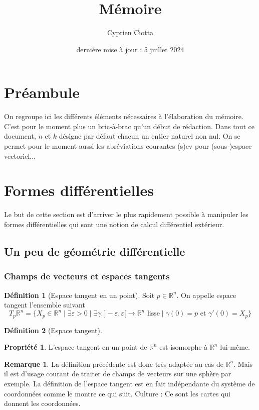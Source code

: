 \documentclass{article}
\title{Mémoire}
\author{Cyprien Ciotta}
\date{dernière mise à jour : 5 juillet 2024}
\newcommand{\R}{\mathbb{R}} %
\theoremstyle{definition} %
\newtheorem{defi}{Définition}
\newtheorem{rmq}{Remarque}
\newtheorem{propri}{Propriété}
\newcommand{\1}{\mathbb{1}} %
\begin{document}
\maketitle

\section{Préambule}
On regroupe ici les différents éléments nécessaires à l'élaboration du mémoire. C'est pour le moment plus un bric-à-brac qu'un début de rédaction.
Dans tout ce document, $n$ et $k$ désigne par défaut chacun un entier naturel non nul.
On se permet pour le moment aussi les abréviations courantes (s)ev pour (sous-)espace vectoriel...


\section{Formes différentielles}
Le but de cette section est d'arriver le plus rapidement possible à manipuler les formes différentielles qui sont une notion de calcul différentiel extérieur.

\subsection{Un peu de géométrie différentielle}

\subsubsection{Champs de vecteurs et espaces tangents}

\begin{defi}[Espace tangent en un point]
Soit $p \in \R^n$. On appelle espace tangent l'ensemble suivant
$$T_p\R^n = \{X_p \in \R^n \mid \exists \varepsilon >0 \mid \exists \gamma : ]-\varepsilon,\varepsilon[ \to \R^n \text{ lisse} \mid \gamma(0) = p \text{ et }\gamma'(0) = X_p \}$$
\end{defi}

\begin{defi}[Espace tangent]
\end{defi}

\begin{propri}
L'espace tangent en un point de $\R^n$ est isomorphe à $\R^n$ lui-même.
\end{propri}

\begin{rmq}
La définition précédente est donc très adaptée au cas de $\R^n$. Mais il est d'usage courant de traiter de champs de vecteurs sur une sphère par exemple. La définition de l'espace tangent est en fait indépendante du système de coordonnées comme le montre ce qui suit. Culture : Ce sont les cartes qui donnent les coordonnées.
\end{rmq}
\end{document}

